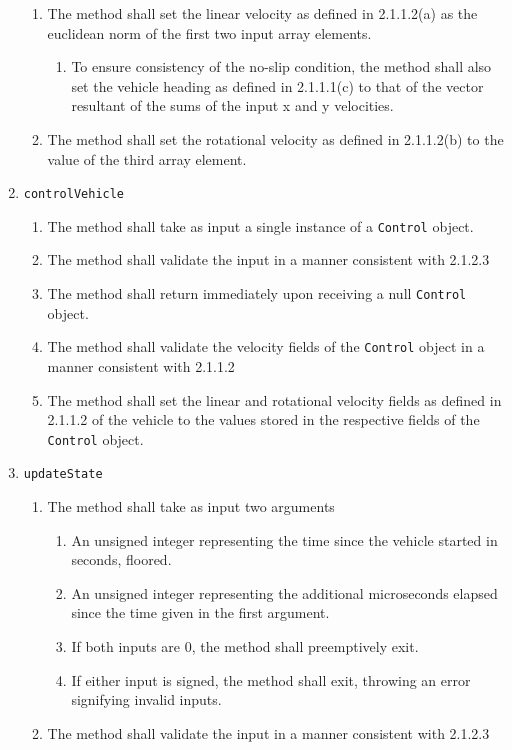 \documentclass{article}
\begin{document}
\begin{enumerate}
\begin{enumerate}
		\item The method shall set the linear velocity as defined in 2.1.1.2(a) as the euclidean norm of the first two input array elements.
		\begin{enumerate}
			\item To ensure consistency of the no-slip condition, the method shall also set the vehicle heading as defined in 2.1.1.1(c) to that of the vector resultant of the sums of the input x and y velocities.
		\end{enumerate}
		\item The method shall set the rotational velocity as defined in 2.1.1.2(b) to the value of the third array element.
	\end{enumerate}
	\item \verb|controlVehicle|
	\begin{enumerate}
		\item The method shall take as input a single instance of a \verb|Control| object.
		\item The method shall validate the input in a manner consistent with 2.1.2.3
		\item The method shall return immediately upon receiving a null \verb|Control| object.
		\item The method shall validate the velocity fields of the \verb|Control| object in a manner consistent with 2.1.1.2
		\item The method shall set the linear and rotational velocity fields as defined in 2.1.1.2 of the vehicle to the values stored in the respective fields of the \verb|Control| object.
	\end{enumerate}
	\item \verb|updateState|
	\begin{enumerate}
		\item The method shall take as input two arguments
		\begin{enumerate}
			\item An unsigned integer representing the time since the vehicle started in seconds, floored.
			\item An unsigned integer representing the additional microseconds elapsed since the time given in the first argument.
			\item If both inputs are 0, the method shall preemptively exit.
			\item If either input is signed, the method shall exit, throwing an error signifying invalid inputs.
		\end{enumerate}
		\item The method shall validate the input in a manner consistent with 2.1.2.3

\end{enumerate}
\end{enumerate}
\end{document}
